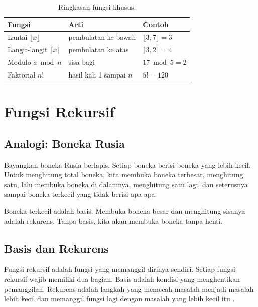 \documentclass[11pt,a4paper]{article}
\begin{document}
\begin{table}[H]
	\centering
	\caption{Ringkasan fungsi khusus.}
	\label{tab:fungsi-khusus}
	\small
	\begin{tabularx}{\textwidth}{l X X}
		\toprule
		Fungsi                          & Arti                    & Contoh                    \\
		\midrule
		Lantai $\lfloor x \rfloor$      & pembulatan ke bawah     & $\lfloor 3{,}7 \rfloor=3$ \\
		Langit-langit $\lceil x \rceil$ & pembulatan ke atas      & $\lceil 3{,}2 \rceil=4$   \\
		Modulo $a \bmod n$              & sisa bagi               & $17 \bmod 5=2$            \\
		Faktorial $n!$                  & hasil kali 1 sampai $n$ & $5!=120$                  \\
		\bottomrule
	\end{tabularx}
\end{table}

\section{Fungsi Rekursif}

\subsection{Analogi: Boneka Rusia}

Bayangkan boneka Rusia berlapis. Setiap boneka berisi boneka yang lebih kecil. Untuk menghitung total boneka, kita membuka boneka terbesar, menghitung satu, lalu membuka boneka di dalamnya, menghitung satu lagi, dan seterusnya sampai boneka terkecil yang tidak berisi apa-apa.

Boneka terkecil adalah basis. Membuka boneka besar dan menghitung sisanya adalah rekurens. Tanpa basis, kita akan membuka boneka tanpa henti.

\subsection{Basis dan Rekurens}

Fungsi rekursif adalah fungsi yang memanggil dirinya sendiri. Setiap fungsi rekursif wajib memiliki dua bagian. Basis adalah kondisi yang menghentikan pemanggilan. Rekurens adalah langkah yang memecah masalah menjadi masalah lebih kecil dan memanggil fungsi lagi dengan masalah yang lebih kecil itu \cite{rosen}.
\end{document}
